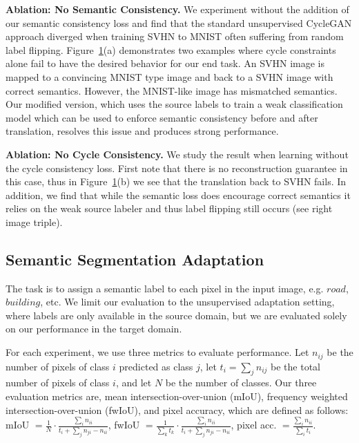\begin{figure}
	\label{fig:cyclegan_fail}
\end{figure}

\textbf{Ablation: No Semantic Consistency.} We experiment without the addition of our semantic consistency loss and find that the standard unsupervised CycleGAN approach diverged when training SVHN to MNIST often suffering from random label flipping.
 Figure~\ref{fig:cyclegan_fail}(a) demonstrates two examples where cycle constraints alone fail to have the desired behavior for our end task. An SVHN image is mapped to a convincing MNIST type image and back to a SVHN image with correct semantics. However, the MNIST-like image has mismatched semantics. Our modified version, which uses the source labels to train a weak classification model which can be used to enforce semantic consistency before and after translation, resolves this issue and produces strong performance.
 
 \textbf{Ablation: No Cycle Consistency.} We study the result when learning without the cycle consistency loss. First note that there is no reconstruction guarantee in this case, thus in Figure~\ref{fig:cyclegan_fail}(b) we see that the translation back to SVHN fails. In addition, we find that while the semantic loss does encourage correct semantics it relies on the weak source labeler and thus label flipping still occurs (see right image triple).



\subsection{Semantic Segmentation Adaptation}
The task is to assign a semantic label to each pixel in the input image, e.g. $road$, $building$, etc.
We limit our evaluation to the unsupervised adaptation setting, where labels are only available in the source domain, but we are evaluated solely on our performance in the target domain.

For each experiment, we use three metrics to evaluate performance.
Let $n_{ij}$ be the number of pixels of class $i$ predicted as class $j$, let $t_i = \sum_j n_{ij}$ be the total number of pixels of class $i$, and let $N$ be the number of classes.
Our three evaluation metrics are, mean intersection-over-union (mIoU), frequency weighted intersection-over-union (fwIoU), and pixel accuracy, which are defined as follows: \\
mIoU $=\frac{1}{N} \cdot \frac{\sum_i n_{ii}}{t_i + \sum_j n_{ji} - n_{ii}}$, fwIoU $=\frac{1}{\sum_k t_k} \cdot \frac{\sum_i n_{ii}}{t_i + \sum_j n_{ji} - n_{ii}}$, pixel acc. $=\frac{\sum_i n_{ii}}{\sum_i t_i}$.

